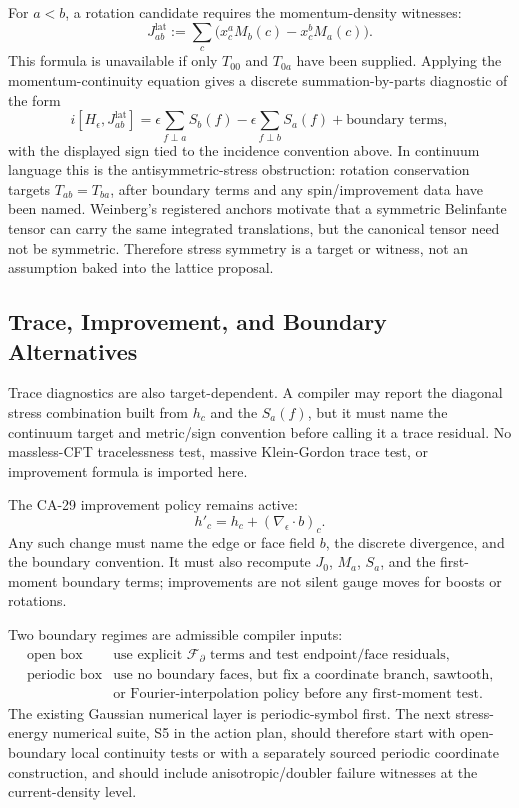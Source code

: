 For \(a<b\), a rotation candidate requires the momentum-density witnesses:
\[
  J_{ab}^{\mathrm{lat}}
  :=
  \sum_c \bigl(x_c^aM_b(c)-x_c^bM_a(c)\bigr).
\]
This formula is unavailable if only \(T_{00}\) and \(T_{0a}\) have been supplied.
Applying the momentum-continuity equation gives a discrete summation-by-parts
diagnostic of the form
\[
  i[H_\epsilon,J_{ab}^{\mathrm{lat}}]
  =
  \epsilon\sum_{f\perp a} S_b(f)
  -
  \epsilon\sum_{f\perp b} S_a(f)
  +
  \text{boundary terms},
\]
with the displayed sign tied to the incidence convention above.  In continuum
language this is the antisymmetric-stress obstruction: rotation conservation
targets \(T_{ab}=T_{ba}\), after boundary terms and any spin/improvement data
have been named.  Weinberg's registered anchors motivate that a symmetric
Belinfante tensor can carry the same integrated translations, but the canonical
tensor need not be symmetric.  Therefore stress symmetry is a target or
witness, not an assumption baked into the lattice proposal.

\subsection{Trace, Improvement, and Boundary Alternatives}

Trace diagnostics are also target-dependent.  A compiler may report the
diagonal stress combination built from \(h_c\) and the \(S_a(f)\), but it must
name the continuum target and metric/sign convention before calling it a trace
residual.  No massless-CFT tracelessness test, massive Klein-Gordon trace test,
or improvement formula is imported here.

The CA-29 improvement policy remains active:
\[
  h'_c=h_c+(\nabla_\epsilon\cdot b)_c .
\]
Any such change must name the edge or face field \(b\), the discrete divergence,
and the boundary convention.  It must also recompute \(J_0\), \(M_a\), \(S_a\),
and the first-moment boundary terms; improvements are not silent gauge moves for
boosts or rotations.

Two boundary regimes are admissible compiler inputs:
\[
\begin{array}{ll}
\text{open box} &
  \text{use explicit }\mathcal F_\partial\text{ terms and test endpoint/face
  residuals},\\
\text{periodic box} &
  \text{use no boundary faces, but fix a coordinate branch, sawtooth,}\\
  &\text{or Fourier-interpolation policy before any first-moment test}.
\end{array}
\]
The existing Gaussian numerical layer is periodic-symbol first.  The next
stress-energy numerical suite, S5 in the action plan, should therefore start
with open-boundary local continuity tests or with a separately sourced periodic
coordinate construction, and should include anisotropic/doubler failure
witnesses at the current-density level.
